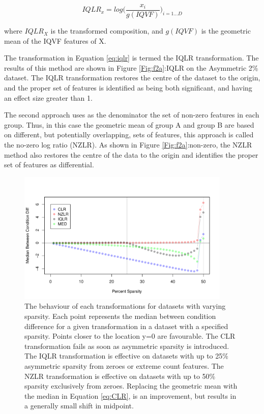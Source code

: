 \documentclass[10pt]{article}
\begin{document}
\begin{equation}
IQLR_x = log  \big( \frac{x_i}{g(IQVF)}   \big)_{i=1 \dots D}
\label{eq:iqlr}
\end{equation}

where $IQLR_X$ is the transformed composition, and 	$g(IQVF)$ is the geometric mean of the IQVF features of X. 
 
 
The transformation in Equation \ref{eq:iqlr} is termed the IQLR transformation. The results of this method are shown in Figure \ref{Fig:f2a}:IQLR on the Asymmetric 2\% dataset. The IQLR transformation restores the centre of the dataset to the origin, and the proper set of features is identified as being both significant, and having an effect size greater than 1.

The second approach uses as the denominator the set of non-zero features in each group.  Thus, in this case the geometric mean of group A and group B are based on different, but potentially overlapping, sets of features, this approach is called the no-zero log ratio (NZLR). As shown in Figure \ref{Fig:f2a}:non-zero, the NZLR method also restores the centre of the data to the origin and identifies the proper set of features as differential. 

\begin{figure}[th!]
\includegraphics[width=4in]{../figures/Fig_failure.pdf}
\caption{The behaviour of each transformations for datasets with varying sparsity. Each point represents the median between condition difference for a given transformation in a dataset with a specified sparsity. Points closer to the location y=0 are favourable. The CLR transformation fails as soon as asymmetric sparsity is introduced. The IQLR  transformation is effective on datasets with up to 25\% asymmetric sparsity from zeroes or extreme count features. The NZLR transformation is effective on datasets with up to 50\% sparsity exclusively from zeroes. Replacing the geometric mean with the median in Equation \ref{eq:CLR}, is an improvement, but results in a generally small shift in midpoint.}
\label{Fig:failure}
\end{figure}
\end{document}

